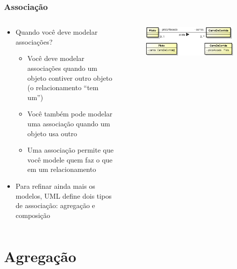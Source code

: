 \documentclass[aspectratio=169]{beamer}
\begin{document}
\begin{frame}\frametitle{Associação}
\begin{columns}
\begin{column}{0.5\linewidth}
\begin{itemize}
	\item Quando você deve modelar associações?
	\begin{itemize}
		\item Você deve modelar associações quando um objeto contiver outro objeto (o relacionamento ``tem um'')
		\item Você também pode modelar uma associação quando um objeto usa outro
		\item Uma associação permite que você modele quem faz o que em um relacionamento
	\end{itemize}
	\item Para refinar ainda mais os modelos, UML define dois tipos de associação: agregação e composição
\end{itemize}
\end{column}
\begin{column}{0.5\linewidth}
		\begin{figure}[h]
			\includegraphics[height=0.25\paperheight]{imagens/associacao2.png}
		\end{figure}
\end{column}
\end{columns}
\end{frame}

\section{Agregação}
\end{document}

